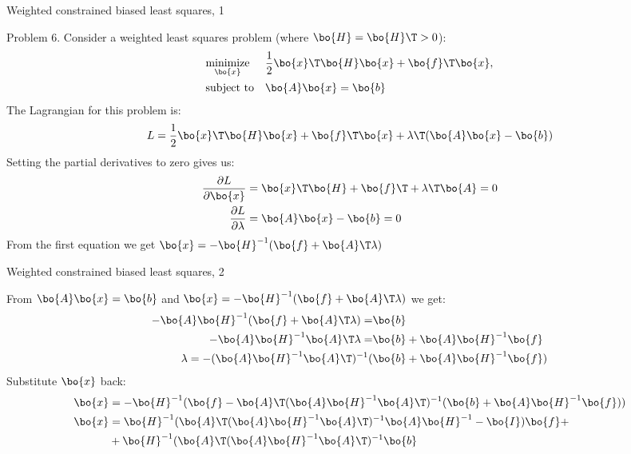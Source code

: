 \documentclass{beamer}
\begin{document}
\begin{frame}{Weighted constrained biased least squares, 1}
	\begin{flushleft}
		
		Problem 6. Consider a weighted least squares problem (where $\bo{H} = \bo{H}\T > 0$):
		\begin{equation}
			\begin{aligned}
				& \underset{\bo{x}}{\text{minimize}}
				& & \frac{1}{2} \bo{x}\T \bo{H} \bo{x} + \bo{f}\T \bo{x} , \\
				& \text{subject to}
				& & \bo{A}\bo{x}=\bo{b}
			\end{aligned}
		\end{equation}
		The Lagrangian for this problem is:
		\begin{align}
			L = \frac{1}{2} \bo{x}\T \bo{H} \bo{x} + \bo{f}\T \bo{x} + \lambda\T (\bo{A}\bo{x}-\bo{b})
		\end{align}
		Setting the partial derivatives to zero gives us:
		\begin{align}
			\frac{\partial L}{\partial \bo{x}} &=
			\bo{x}\T \bo{H}  + \bo{f}\T + \lambda\T \bo{A} = 0 
			\\
			\frac{\partial L}{\partial \lambda} &= \bo{A}\bo{x}-\bo{b} = 0
		\end{align}		
		From the first equation we get $\bo{x}  = -\bo{H}^{-1}(\bo{f} + \bo{A}\T \lambda)$
		
	\end{flushleft}
\end{frame}


\begin{frame}{Weighted constrained biased least squares, 2}
	\begin{flushleft}
		
		From $\bo{A}\bo{x}=\bo{b}$ and $\bo{x}  = -\bo{H}^{-1}(\bo{f} + \bo{A}\T \lambda)$ we get:
		\begin{align}
			-\bo{A}\bo{H}^{-1}(\bo{f} + \bo{A}\T \lambda)=&\bo{b}
			\\
			-\bo{A}\bo{H}^{-1} \bo{A}\T \lambda = &\bo{b} + \bo{A}\bo{H}^{-1}\bo{f}
			\\
			\lambda = -(\bo{A}\bo{H}^{-1} \bo{A}\T)^{-1}(&\bo{b} + \bo{A}\bo{H}^{-1}\bo{f})
		\end{align}		
		Substitute $\bo{x}$ back: 
		\begin{align}
			\bo{x}  &= -\bo{H}^{-1}(\bo{f} - \bo{A}\T (\bo{A}\bo{H}^{-1} \bo{A}\T)^{-1}(\bo{b} + \bo{A}\bo{H}^{-1}\bo{f}))
			\\
			\bo{x}  &= \bo{H}^{-1}(\bo{A}\T (\bo{A}\bo{H}^{-1} \bo{A}\T)^{-1} \bo{A}\bo{H}^{-1}-\bo{I})\bo{f}
			+ \\ &+
			 \bo{H}^{-1} (\bo{A}\T (\bo{A}\bo{H}^{-1} \bo{A}\T)^{-1} \bo{b} 
		\end{align}		
		
		
	\end{flushleft}
\end{frame}
\end{document}
